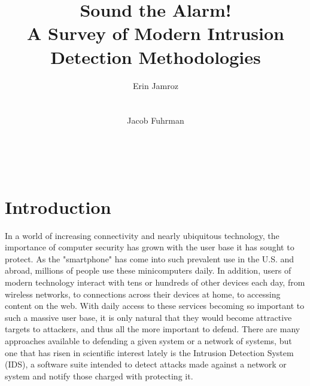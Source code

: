 \documentclass{acm_proc_article-sp}
\begin{document}
\title{Sound the Alarm!\\A Survey of Modern Intrusion Detection Methodologies} 

\author{
\alignauthor
Erin Jamroz
       \\
       \\
       \\
\alignauthor
Jacob Fuhrman
       \\
       \\
       \\
       \\       
}

\maketitle

\begin{abstract}
\end{abstract}

\section{Introduction}
	In a world of increasing connectivity and nearly ubiquitous technology, the importance of computer security has grown with the user base it has sought to protect. As the "smartphone" has come into such prevalent use in the U.S. and abroad, millions of people use these minicomputers daily. In addition, users of modern technology interact with tens or hundreds of other devices each day, from wireless networks, to connections across their devices at home, to accessing content on the web. With daily access to these services becoming so important to such a massive user base, it is only natural that they would become attractive targets to attackers, and thus all the more important to defend. There are many approaches available to defending a given system or a network of systems, but one that has risen in scientific interest lately is the Intrusion Detection System (IDS), a software suite intended to detect attacks made against a network or system and notify those charged with protecting it.
	
\end{document}
